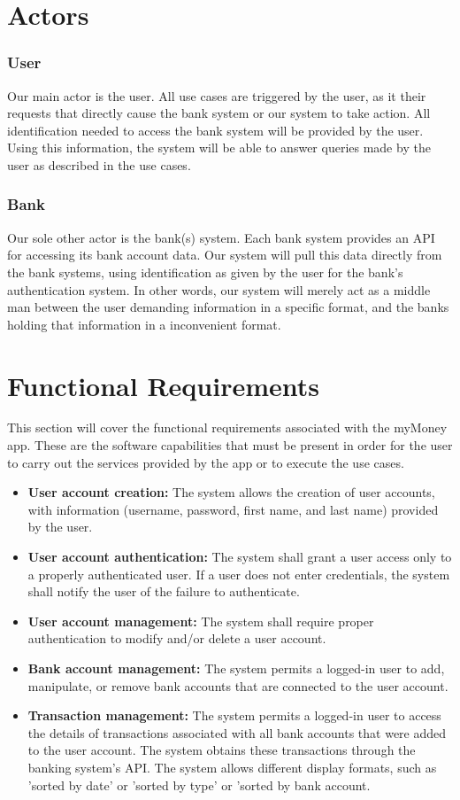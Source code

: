 \section{Actors}
\subsubsection{User}
Our main actor is the user. All use cases are triggered by the user, as it their requests that directly cause the bank system or our system to take action. All identification needed to access the bank system will be provided by the user. Using this information, the system will be able to answer queries made by the user as described in the use cases.
\subsubsection{Bank}
Our sole other actor is the bank(s) system. Each bank system provides an API for accessing its bank account data. Our system will pull this data directly from the bank systems, using identification as given by the user for the bank's authentication system. In other words, our system will merely act as a middle man between the user demanding information in a specific format, and the banks holding that information in a inconvenient format.

\section{Functional Requirements}

This section will cover the functional requirements associated with the myMoney app. These are the software capabilities that must be present in order for the user to carry out the services provided by the app or to execute the use cases.

\begin{itemize}
    \item  \textbf{User account creation:} The system allows the creation of user accounts, with information (username, password, first name, and last name) provided by the user.
    \item \textbf{User account authentication:} The system shall grant a user access only to a properly authenticated user. If a user does not enter credentials, the system shall notify the user of the failure to authenticate.
    \item \textbf{User account management:} The system shall require proper authentication to modify and/or delete a user account.
    \item  \textbf{Bank account management:} The system permits a logged-in user to add, manipulate, or remove bank accounts that are connected to the user account.
    \item  \textbf{Transaction management:} The system permits a logged-in user to access the details of transactions associated with all bank accounts that were added to the user account. The system obtains these transactions through the banking system's API. The system allows different display formats, such as 'sorted by date' or 'sorted by type' or 'sorted by bank account.
    \end{itemize}

